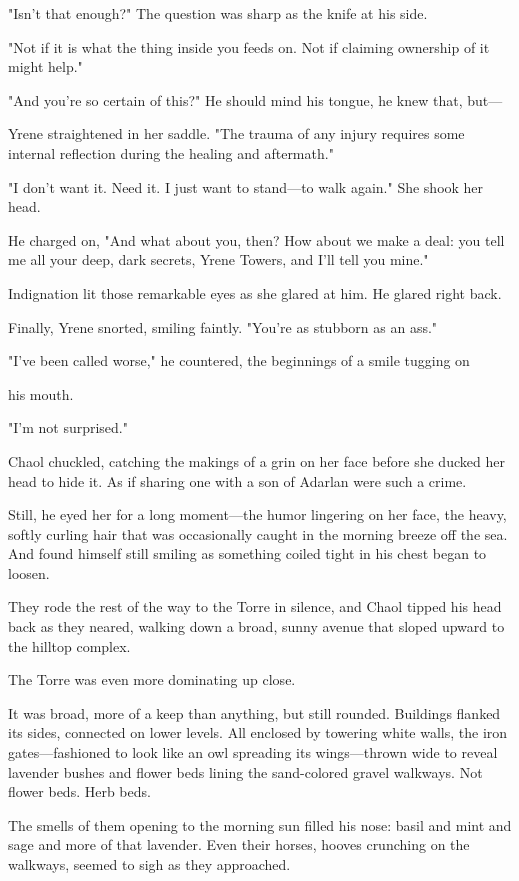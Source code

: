 "Isn't that enough?" The question was sharp as the knife at his side.

"Not if it is what the thing inside you feeds on. Not if claiming ownership of it might help."

"And you're so certain of this?" He should mind his tongue, he knew that, but---

Yrene straightened in her saddle. "The trauma of any injury requires some internal reflection during the healing and aftermath."

"I don't want it. Need it. I just want to stand---to walk again." She shook her head.

He charged on, "And what about you, then? How about we make a deal: you tell me all your deep, dark secrets, Yrene Towers, and I'll tell you mine."

Indignation lit those remarkable eyes as she glared at him. He glared right back.

Finally, Yrene snorted, smiling faintly. "You're as stubborn as an ass."

"I've been called worse," he countered, the beginnings of a smile tugging on

his mouth.

"I'm not surprised."

Chaol chuckled, catching the makings of a grin on her face before she ducked her head to hide it. As if sharing one with a son of Adarlan were such a crime.

Still, he eyed her for a long moment---the humor lingering on her face, the heavy, softly curling hair that was occasionally caught in the morning breeze off the sea. And found himself still smiling as something coiled tight in his chest began to loosen.

They rode the rest of the way to the Torre in silence, and Chaol tipped his head back as they neared, walking down a broad, sunny avenue that sloped upward to the hilltop complex.

The Torre was even more dominating up close.

It was broad, more of a keep than anything, but still rounded. Buildings flanked its sides, connected on lower levels. All enclosed by towering white walls, the iron gates---fashioned to look like an owl spreading its wings---thrown wide to reveal lavender bushes and flower beds lining the sand-colored gravel walkways. Not flower beds. Herb beds.

The smells of them opening to the morning sun filled his nose: basil and mint and sage and more of that lavender. Even their horses, hooves crunching on the walkways, seemed to sigh as they approached.

